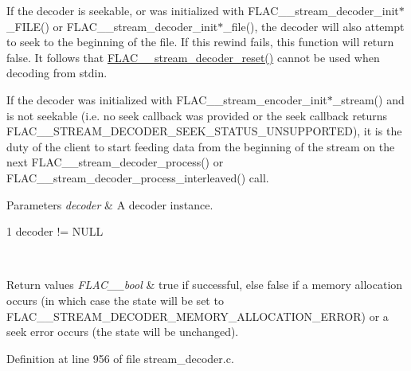 If the decoder is seekable, or was initialized with F\+L\+A\+C\+\_\+\+\_\+stream\+\_\+decoder\+\_\+init$\ast$\+\_\+\+F\+I\+LE() or F\+L\+A\+C\+\_\+\+\_\+stream\+\_\+decoder\+\_\+init$\ast$\+\_\+file(), the decoder will also attempt to seek to the beginning of the file. If this rewind fails, this function will return {\ttfamily false}. It follows that \hyperlink{group__flac__stream__decoder_ga2342cf4f3caf9ad20fca1373aaea0c27}{F\+L\+A\+C\+\_\+\+\_\+stream\+\_\+decoder\+\_\+reset()} cannot be used when decoding from {\ttfamily stdin}.

If the decoder was initialized with F\+L\+A\+C\+\_\+\+\_\+stream\+\_\+encoder\+\_\+init$\ast$\+\_\+stream() and is not seekable (i.\+e. no seek callback was provided or the seek callback returns {\ttfamily F\+L\+A\+C\+\_\+\+\_\+\+S\+T\+R\+E\+A\+M\+\_\+\+D\+E\+C\+O\+D\+E\+R\+\_\+\+S\+E\+E\+K\+\_\+\+S\+T\+A\+T\+U\+S\+\_\+\+U\+N\+S\+U\+P\+P\+O\+R\+T\+ED}), it is the duty of the client to start feeding data from the beginning of the stream on the next F\+L\+A\+C\+\_\+\+\_\+stream\+\_\+decoder\+\_\+process() or F\+L\+A\+C\+\_\+\+\_\+stream\+\_\+decoder\+\_\+process\+\_\+interleaved() call.


\begin{DoxyParams}{Parameters}
{\em decoder} & A decoder instance.  
\begin{DoxyCode}
1 decoder != NULL 
\end{DoxyCode}
 \\
\hline
\end{DoxyParams}

\begin{DoxyRetVals}{Return values}
{\em F\+L\+A\+C\+\_\+\+\_\+bool} & {\ttfamily true} if successful, else {\ttfamily false} if a memory allocation occurs (in which case the state will be set to {\ttfamily F\+L\+A\+C\+\_\+\+\_\+\+S\+T\+R\+E\+A\+M\+\_\+\+D\+E\+C\+O\+D\+E\+R\+\_\+\+M\+E\+M\+O\+R\+Y\+\_\+\+A\+L\+L\+O\+C\+A\+T\+I\+O\+N\+\_\+\+E\+R\+R\+OR}) or a seek error occurs (the state will be unchanged). \\
\hline
\end{DoxyRetVals}


Definition at line 956 of file stream\+\_\+decoder.\+c.

